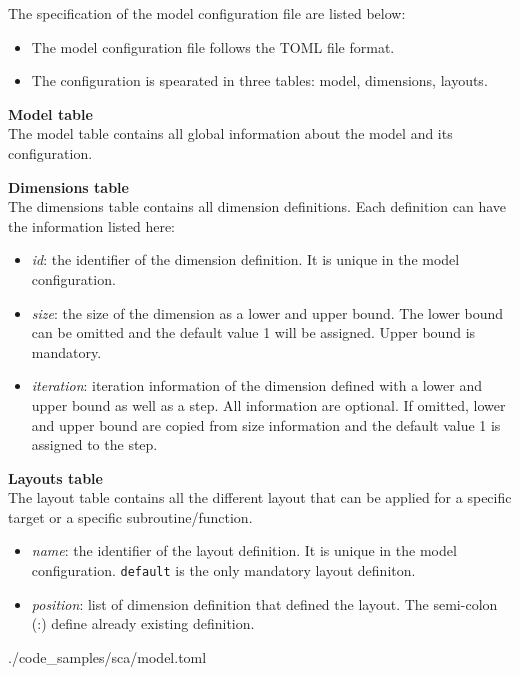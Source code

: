 The specification of the model configuration file are listed below:
\begin{itemize}
  \item The model configuration file follows the TOML file format.
  \item The configuration is spearated in three tables: model, dimensions,
        layouts.
\end{itemize}

\textbf{Model table}\\
The model table contains all global information about the model and its
configuration.

\textbf{Dimensions table}\\
The dimensions table contains all dimension definitions. Each definition can
have the information listed here:
\begin{itemize}
  \item \textit{id}: the identifier of the dimension definition. It is unique
        in the model configuration.
  \item \textit{size}: the size of the dimension as a lower and upper bound.
        The lower bound can be omitted and the default value 1 will be assigned.
        Upper bound is mandatory.
  \item \textit{iteration}: iteration information of the dimension defined with
        a lower and upper bound as well as a step. All information are optional.
        If omitted, lower and upper bound are copied from size information and
        the default value 1 is assigned to the step.
\end{itemize}


\textbf{Layouts table}\\
The layout table contains all the different layout that can be applied for a
specific target or a specific subroutine/function.
\begin{itemize}
  \item \textit{name}: the identifier of the layout definition. It is unique in
        the model configuration. \lstinline|default| is the only mandatory
        layout definiton.
  \item \textit{position}: list of dimension definition that defined the layout.
        The semi-colon (:) define already existing definition.
\end{itemize}


      {./code_samples/sca/model.toml}